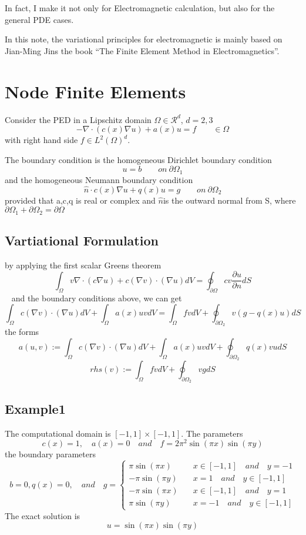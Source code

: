 In fact, I make it not only for Electromagnetic calculation, but also for the general P\+DE cases.

In this note, the variational principles for electromagnetic is mainly based on Jian-\/\+Ming Jin\textquotesingle{}s the book “\+The Finite Element Method in Electromagnetics”.\hypertarget{index_nodeFEM}{}\section{Node Finite Elements}\label{index_nodeFEM}
Consider the P\+ED in a Lipschitz domain $ \Omega\in\mathcal{R}^d$, $ d=2,3$ \[ -\nabla \cdot (c(x)\nabla u) +a(x)u =f \qquad \in \Omega \] with right hand side $ f \in L^2(\Omega)^d $.

The boundary condition is the homogeneous Dirichlet boundary condition \[ u = b \qquad on \ \partial\Omega_1 \] and the homogeneous Neumann boundary condition \[ \hat{n}\cdot c(x)\nabla u + q(x)u = g \qquad on \ \partial\Omega_2 \] provided that a,c,q is real or complex and $ \hat{n}$is the outward normal from S, where $ \partial\Omega_1+\partial\Omega_2 = \partial\Omega $\hypertarget{index_forms}{}\subsection{Vartiational Formulation}\label{index_forms}
by applying the first scalar Green\textquotesingle{}s theorem \[ \int_\Omega v \nabla \cdot (c\nabla u) + c(\nabla v) \cdot (\nabla u) dV = \oint_{\partial\Omega} cv\frac{\partial u}{\partial n}dS \] ~\newline
and the boundary conditions above, we can get \[ \int_\Omega c(\nabla v) \cdot (\nabla u)dV +\int_\Omega a(x)uv dV = \int_\Omega fv dV + \oint_{\partial\Omega_2} v(g-q(x)u)dS \] the forms \[ a(u,v) := \int_\Omega c(\nabla v) \cdot (\nabla u) dV +\int_\Omega a(x)uv dV+\oint_{\partial\Omega_2}q(x)vudS \] \[ rhs(v) := \int_\Omega fv dV + \oint_{\partial\Omega_2} vgdS \]\hypertarget{index_exp1}{}\subsection{Example1}\label{index_exp1}
The computational domain is $[-1,1]\times [-1,1]$. The parameters \[ c(x) = 1 ,\quad a(x) = 0 \quad and \quad f = 2\pi^2\sin(\pi x)\sin(\pi y) \] the boundary parameters \[ b = 0, q(x) = 0 ,\quad and \quad g = \left\{ \begin{array}{ll} \pi \sin(\pi x) &\quad x \in [-1,1] \quad and \quad y=-1 \\ -\pi \sin(\pi y) &\quad x = 1 \quad and \quad y \in [-1,1] \\ -\pi \sin(\pi x) &\quad x \in [-1,1] \quad and \quad y=1 \\ \pi \sin(\pi y) &\quad x = -1 \quad and \quad y \in [-1,1] \end{array}\right. \] The exact solution is \[ u=\sin(\pi x)\sin(\pi y)\]

